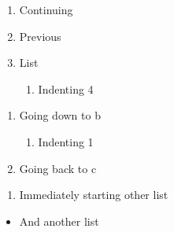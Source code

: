 \documentclass{article}
\begin{document}
	\begin{enumerate}


		\item Continuing



		\item Previous



		\item List

		\begin{enumerate}


			\item Indenting 4


		\end{enumerate}
	\end{enumerate}
	\begin{enumerate}


		\item Going down to b

		\begin{enumerate}


			\item Indenting 1


		\end{enumerate}

		\item Going back to c


	\end{enumerate}
	\begin{enumerate}


		\item Immediately starting other list


	\end{enumerate}
	\begin{itemize}


		\item And another list


	\end{itemize}
\end{document}
